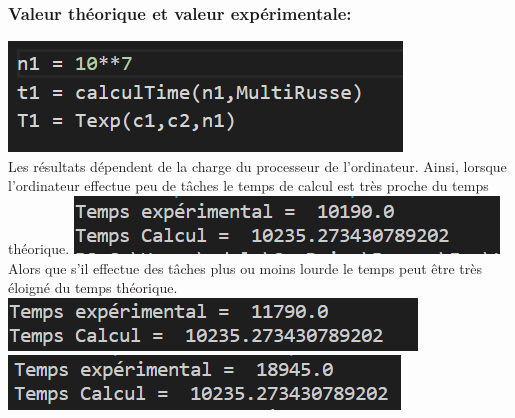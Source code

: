 \documentclass[12pt,a4paper]{report}
\begin{document}
\begin{flushleft}
\subsubsection{Valeur théorique et valeur expérimentale: }
\includegraphics[scale=0.5]{ExpTheo} \\ Les résultats dépendent de la charge du processeur de l'ordinateur. Ainsi, lorsque l'ordinateur effectue peu de tâches le temps de calcul est très proche du temps théorique.
\includegraphics[scale=0.5]{TempGOOD} \\
 Alors que s'il effectue des tâches plus ou moins lourde le temps peut être très éloigné du temps théorique. \\
 \includegraphics[scale=0.5]{TempsNOTGOOD}
 \includegraphics[scale=0.5]{TempsNOTGOODATALL}
\end{flushleft}
\end{document}
